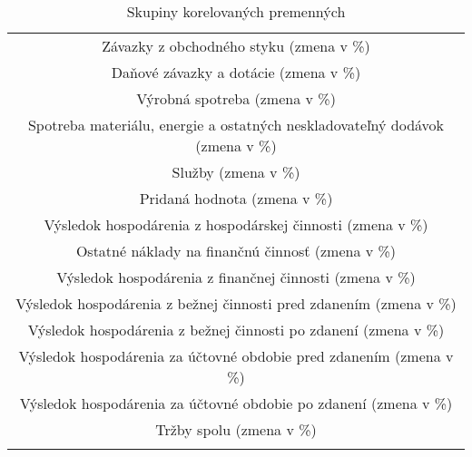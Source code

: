 \begin{longtable}{ |c| }
        Závazky z obchodného styku (zmena v \%) \\
        Daňové závazky a dotácie (zmena v \%) \\
        \hline
        Výrobná spotreba (zmena v \%) \\
        Spotreba materiálu, energie a ostatných neskladovateľný dodávok (zmena v \%) \\
        \hline
        Služby (zmena v \%) \\
        \hline
        Pridaná hodnota (zmena v \%) \\
        \hline
        Výsledok hospodárenia z hospodárskej činnosti (zmena v \%) \\
        \hline
        Ostatné náklady na finančnú činnosť (zmena v \%) \\
        \hline
        Výsledok hospodárenia z finančnej činnosti (zmena v \%) \\
        \hline
        Výsledok hospodárenia z bežnej činnosti pred zdanením (zmena v \%) \\
        \hline
        Výsledok hospodárenia z bežnej činnosti po zdanení (zmena v \%) \\
        \hline
        Výsledok hospodárenia za účtovné obdobie pred zdanením (zmena v \%) \\
        \hline
        Výsledok hospodárenia za účtovné obdobie po zdanení (zmena v \%) \\
        \hline
        Tržby spolu (zmena v \%) \\
        \hline        
    \caption{Skupiny korelovaných premenných}
    \label{skupiny korelovanych premennych}
\end{longtable}